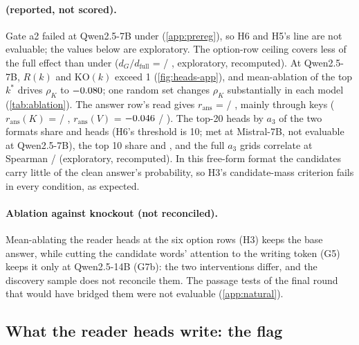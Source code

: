 \paragraph{\fmtPost{} (reported, not scored).} Gate a2 failed at Qwen2.5-7B under \fmtPost{} (\cref{app:prereg}), so H6 and H5's \fmtPost{} line are not evaluable; the values below are exploratory. The option-row ceiling covers less of the full effect than under \fmtOpt{} ($d_G/d_{\mathrm{full}}$ = \HathreeRatioPostQwenSeven{} / \HathreeRatioPostMistralSeven{}, exploratory, recomputed). At Qwen2.5-7B, $R(k)$ and $\mathrm{KO}(k)$ exceed 1 (\cref{fig:heads-app}), and mean-ablation of the top $k^*$ drives $\rho_K$ to $-0.080$; one random set changes $\rho_K$ substantially in each model (\cref{tab:ablation}). The answer row's read gives $r_{\mathrm{ans}}$ = \HfivesAnsQwenSeven{} / \HfivesAnsMistralSeven{}, mainly through keys ($r_{\mathrm{ans}}(K)$ = \HhopAnsKPostQwenSeven{} / \HhopAnsKPostMistralSeven{}, $r_{\mathrm{ans}}(V)$ = $-0.046$ / \HhopAnsVPostMistralSeven{}). The top-20 heads by $a_3$ of the two formats share \HsixOverlapQwenSeven{} and \HsixOverlapMistralSeven{} heads (H6's threshold is 10; met at Mistral-7B, not evaluable at Qwen2.5-7B), the top 10 share \HcrossToptenQwenSeven{} and \HcrossToptenMistralSeven{}, and the full $a_3$ grids correlate at Spearman \HcrossRhoQwenSeven{} / \HcrossRhoMistralSeven{} (exploratory, recomputed). In this free-form format the candidates carry little of the clean answer's probability, so H3's candidate-mass criterion fails in every condition, as expected.

\paragraph{Ablation against knockout (not reconciled).} Mean-ablating the reader heads at the six option rows (H3) keeps the base answer, while cutting the candidate words' attention to the writing token (G5) keeps it only at Qwen2.5-14B (G7b): the two interventions differ, and the discovery sample does not reconcile them. The passage tests of the final round that would have bridged them were not evaluable (\cref{app:natural}).

\subsection{What the reader heads write: the flag}\label{app:flag}


